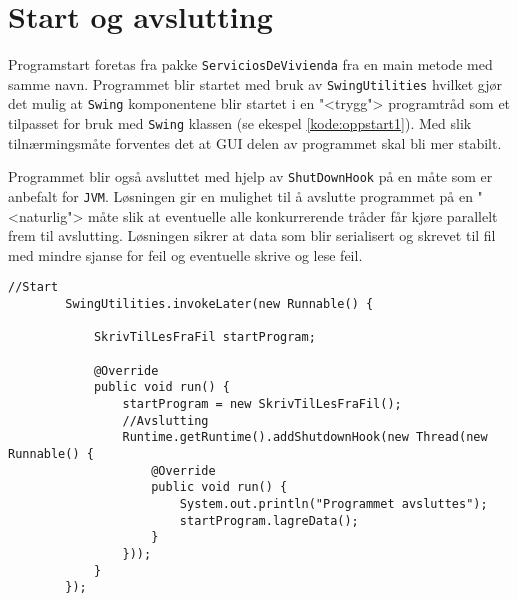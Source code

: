 \section{Start og avslutting}
Programstart foretas fra pakke \texttt{ServiciosDeVivienda} fra en main metode med samme navn. Programmet blir startet med bruk av \texttt{SwingUtilities} hvilket gjør det mulig at \texttt{Swing} komponentene blir startet i en "<trygg"> programtråd som et tilpasset for bruk med \texttt{Swing} klassen (se ekespel \ref{kode:oppstart1}). Med slik tilnærmingsmåte forventes det at GUI delen av programmet skal bli mer stabilt. 

Programmet blir også avsluttet med hjelp av \texttt{ShutDownHook} på en måte som er anbefalt for \texttt{JVM}. Løsningen gir en mulighet til å avslutte programmet på en "<naturlig"> måte slik at eventuelle alle konkurrerende tråder får kjøre parallelt frem til avslutting. Løsningen sikrer at data som blir serialisert og skrevet til fil med mindre sjanse for feil og eventuelle skrive og lese feil.

\begin{lstlisting}[caption=Oppstart av programmet., label=kode:oppstart1]
		//Start
        SwingUtilities.invokeLater(new Runnable() {

            SkrivTilLesFraFil startProgram;

            @Override
            public void run() {
                startProgram = new SkrivTilLesFraFil();
                //Avslutting
                Runtime.getRuntime().addShutdownHook(new Thread(new Runnable() {
                    @Override
                    public void run() {
                        System.out.println("Programmet avsluttes");
                        startProgram.lagreData();
                    }
                }));
            }
        });
\end{lstlisting}